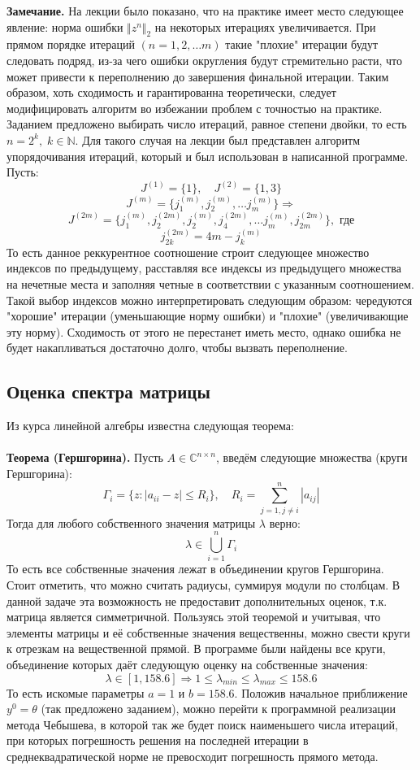 \documentclass[a4paper,12pt,titlepage,final]{article}
\begin{document}
\textbf{Замечание.} На лекции было показано, что на практике имеет место следующее явление: норма ошибки $\Vert z^n \Vert_2$ на некоторых итерациях увеличивается. При прямом порядке итераций $(n = 1, 2, \ldots m)$ такие "плохие" итерации будут следовать подряд, из-за чего ошибки округления будут стремительно расти, что может привести к переполнению до завершения финальной итерации. Таким образом, хоть сходимость и гарантированна теоретически, следует модифицировать алгоритм во избежании проблем с точностью на практике. Заданием предложено выбирать число итераций, равное степени двойки, то есть $n = 2^k, \; k \in \mathbb{N}$. Для такого случая на лекции был представлен алгоритм упорядочивания итераций, который и был использован в написанной программе. Пусть:
$$J^{(1)} = \{1\}, \quad J^{(2)} = \{1, 3\} $$
$$J^{(m)} = \{ j_1^{(m)},  j_2^{(m)}, \ldots j_m^{(m)}\} \Rightarrow$$
$$J^{(2m)} = \{ j_1^{(m)}, j_2^{(2m)} , j_2^{(m)}, j_4^{(2m)} , \ldots j_m^{(m)}, j_{2m}^{(2m)}\}, \text{ где}$$
$$j_{2k}^{(2m)} = 4m - j_k^{(m)}$$
То есть данное реккурентное соотношение строит следующее множество индексов по предыдущему, расставляя все индексы из предыдущего множества на нечетные места и заполняя четные в соответствии с указанным соотношением. Такой выбор индексов можно интерпретировать следующим образом: чередуются "хорошие" итерации (уменьшающие норму ошибки) и "плохие" (увеличивающие эту норму). Сходимость от этого не перестанет иметь место, однако ошибка не будет накапливаться достаточно долго, чтобы вызвать переполнение.
\subsection{Оценка спектра матрицы}
Из курса линейной алгебры известна следующая теорема: \\ \\
\textbf{Теорема (Гершгорина).} Пусть $A \in \mathbb{C}^{n\times n}$, введём следующие множества (круги Гершгорина):
$$\Gamma_i = \{z: |a_{ii} - z| \leq R_i\} ,\quad R_i = \sum^n_{j=1, j\neq i} |a_{ij}|$$
Тогда для любого собственного значения матрицы $\lambda$ верно:
$$\lambda \in \bigcup_{i=1}^n \Gamma_i$$ То есть все собственные значения лежат в объединении кругов Гершгорина. Стоит отметить, что можно считать радиусы, суммируя модули по столбцам. В данной задаче эта возможность не предоставит дополнительных оценок, т.к. матрица является симметричной. Пользуясь этой теоремой и учитывая, что элементы матрицы и её собственные значения вещественны, можно свести круги к отрезкам на вещественной прямой. В программе были найдены все круги, объединение которых даёт следующую оценку на собственные значения: $$\lambda \in [1, 158.6] \Rightarrow 1 \leq \lambda_{min} \leq \lambda_{max} \leq 158.6$$
То есть искомые параметры $a = 1$ и $b = 158.6$. Положив начальное приближение $y^0 = \theta$ (так предложено заданием), можно перейти к программной реализации метода Чебышева, в которой так же будет поиск наименьшего числа итераций, при которых погрешность решения на последней итерации в среднеквадратической норме не превосходит погрешность прямого метода.
\end{document}
